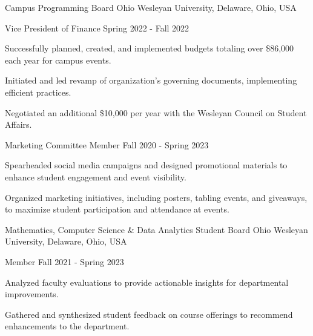 \documentclass[10pt, letterpaper]{article}
\begin{document}
\begin{leadershipentry}
  {Campus Programming Board} %
  {Ohio Wesleyan University, Delaware, Ohio, USA} %
  \begin{positionentry}
    {Vice President of Finance} %
    {Spring 2022 - Fall 2022} %
    \item Successfully planned, created, and implemented budgets totaling over \$86,000 each year for campus events.
    \item Initiated and led revamp of organization's governing documents, implementing efficient practices.
    \item Negotiated an additional \$10,000 per year with the Wesleyan Council on Student Affairs.
  \end{positionentry}
  \begin{positionentry}
    {Marketing Committee Member} %
    {Fall 2020 - Spring 2023} %
    \item Spearheaded social media campaigns and designed promotional materials to enhance student engagement and event visibility.
    \item Organized marketing initiatives, including posters, tabling events, and giveaways, to maximize student participation and attendance at events.
  \end{positionentry}
\end{leadershipentry}

\begin{leadershipentry}
  {Mathematics, Computer Science \& Data Analytics Student Board} %
  {Ohio Wesleyan University, Delaware, Ohio, USA} %
  \begin{positionentry}
    {Member} %
    {Fall 2021 - Spring 2023} %
    \item Analyzed faculty evaluations to provide actionable insights for departmental improvements.
    \item Gathered and synthesized student feedback on course offerings to recommend enhancements to the department.
  \end{positionentry}
\end{leadershipentry}
\end{document}
